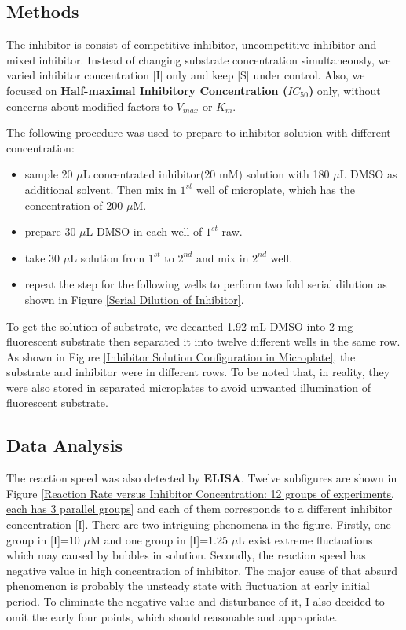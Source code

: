 \documentclass{report}
\begin{document}
\subsection{Methods}
The inhibitor is consist of competitive inhibitor, uncompetitive inhibitor and mixed inhibitor.
Instead of changing substrate concentration simultaneously, we varied inhibitor concentration [I] only and keep [S] under control.
Also, we focused on \textbf{Half-maximal Inhibitory Concentration ($IC_{50}$)} only, without concerns about modified factors to $V_{max}$ or $K_m$.

The following procedure was used to prepare to inhibitor solution with different concentration:

\begin{itemize}
    \item sample 20 $\mu$L concentrated inhibitor(20 mM) solution with 180 $\mu$L DMSO as additional solvent. Then mix in $1^{st}$ well of microplate, which has the concentration of 200 $\mu$M.
    \item prepare 30 $\mu$L DMSO in each well of $1^{st}$ raw.
    \item take 30 $\mu$L solution from $1^{st}$ to $2^{nd}$ and mix in $2^{nd}$ well.
    \item repeat the step for the following wells to perform two fold serial dilution as shown in Figure \ref{Serial Dilution of Inhibitor}.
\end{itemize}

To get the solution of substrate, we decanted 1.92 mL DMSO into 2 mg fluorescent substrate then separated it into twelve different wells in the same row.
As shown in Figure \ref{Inhibitor Solution Configuration in Microplate}, the substrate and inhibitor were in different rows.
To be noted that, in reality, they were also stored in separated microplates to avoid unwanted illumination of fluorescent substrate.



\subsection{Data Analysis}
The reaction speed was also detected by \textbf{ELISA}.
Twelve subfigures are shown in Figure \ref{Reaction Rate versus Inhibitor Concentration: 12 groups of experiments, each has 3 parallel groups} and each of them corresponds to a different inhibitor concentration [I].
There are two intriguing phenomena in the figure.
Firstly, one group in [I]=10 $\mu$M and one group in [I]=1.25 $\mu$L exist extreme fluctuations which may caused by bubbles in solution.
Secondly, the reaction speed has negative value in high concentration of inhibitor.
The major cause of that absurd phenomenon is probably the unsteady state with fluctuation at early initial period.
To eliminate the negative value and disturbance of it, I also decided to omit the early four points, which should reasonable and appropriate.
\end{document}
